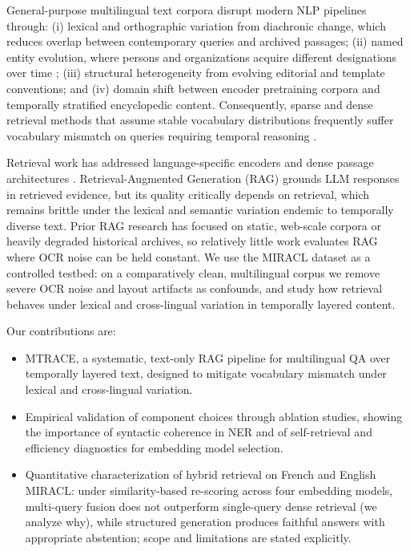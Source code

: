 \documentclass[11pt]{article}
\begin{document}
General-purpose multilingual text corpora disrupt modern NLP pipelines through: (i) lexical and orthographic variation from diachronic change, which reduces overlap between contemporary queries and archived passages; (ii) named entity evolution, where persons and organizations acquire different designations over time \citep{pan-etal-2017-cross,tedeschi2021wikineural}; (iii) structural heterogeneity from evolving editorial and template conventions; and (iv) domain shift between encoder pretraining corpora and temporally stratified encyclopedic content. Consequently, sparse and dense retrieval methods that assume stable vocabulary distributions frequently suffer vocabulary mismatch on queries requiring temporal reasoning \citep{schweter2022hmbert,reimers-2020-multilingual-sentence-bert}.

Retrieval work has addressed language-specific encoders and dense passage architectures \citep{zhang2023miracl}. Retrieval-Augmented Generation (RAG) \citep{lewis2020retrieval} grounds LLM responses in retrieved evidence, but its quality critically depends on retrieval, which remains brittle under the lexical and semantic variation endemic to temporally diverse text. Prior RAG research has focused on static, web-scale corpora or heavily degraded historical archives, so relatively little work evaluates RAG where OCR noise can be held constant. We use the MIRACL dataset \citep{zhang2023miracl} as a controlled testbed: on a comparatively clean, multilingual corpus we remove severe OCR noise and layout artifacts as confounds, and study how retrieval behaves under lexical and cross-lingual variation in temporally layered content.

Our contributions are:
\begin{itemize}
    \item MTRACE, a systematic, text-only RAG pipeline for multilingual QA over temporally layered text, designed to mitigate vocabulary mismatch under lexical and cross-lingual variation.
    \item Empirical validation of component choices through ablation studies, showing the importance of syntactic coherence in NER and of self-retrieval and efficiency diagnostics for embedding model selection.
    \item Quantitative characterization of hybrid retrieval on French and English MIRACL: under similarity-based re-scoring across four embedding models, multi-query fusion does not outperform single-query dense retrieval (we analyze why), while structured generation produces faithful answers with appropriate abstention; scope and limitations are stated explicitly.
\end{itemize}
\end{document}
